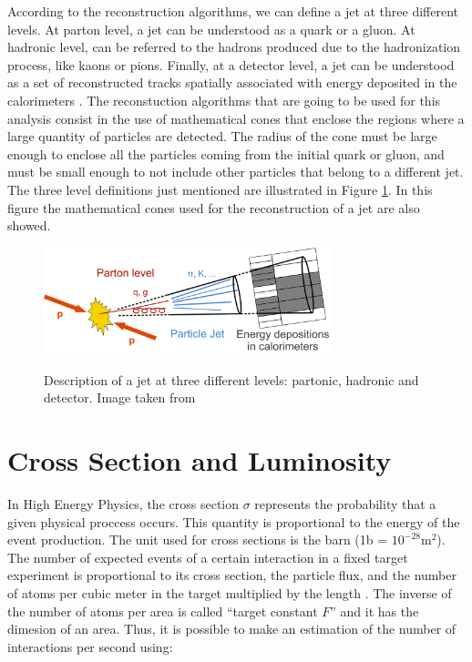 According to the reconstruction algorithms, we can define a jet at three different levels. At parton level, a jet can be understood as a quark or a gluon. At hadronic level, can be referred to the hadrons produced due to the hadronization process, like kaons or pions. Finally, at a detector level, a jet can be understood as a set of reconstructed tracks spatially associated with energy 
 deposited in the calorimeters \cite{Tesis_luis_alfredo}. The reconstuction algorithms that are going to be used for this analysis consist in the use of mathematical cones that enclose the regions where a large quantity of particles are detected. The radius of the cone must be large enough to enclose all the particles coming from the initial quark or gluon, and must be small enough to not include other particles that belong to a different jet. The three level definitions just mentioned are illustrated in Figure \ref{Jets_definitions}. In this figure the mathematical cones used for the reconstruction of a jet are also showed.
  
 \begin{figure}[h] 
 \centering
 \caption{Description of a jet at three different levels: partonic, hadronic and detector. Image taken from \cite{Image_jet_definitions}}
 \includegraphics[width=0.75\textwidth]{./Capitulos/VariableDefinitions/jets_definitions}  
 \label{Jets_definitions}
 \end{figure}
 
 \section{Cross Section and Luminosity}
 
 In High Energy Physics, the cross section $\sigma$ represents the probability that a given physical proccess occurs. This quantity is proportional to the energy of the event production. The unit 
 used for cross sections is the barn (1b = $10^{-28} \text{m}^2$). The number of expected events of a certain interaction in a fixed target experiment is proportional to its cross section, the particle flux, and the
 number of atoms per cubic meter in the target multiplied by the length \cite{Data_analysis_techniques}. The inverse of the number of atoms per area is called ``target constant $F$'' and it has the dimesion of an area. Thus, it 
 is possible to make an estimation of the number of interactions per second using:
 
